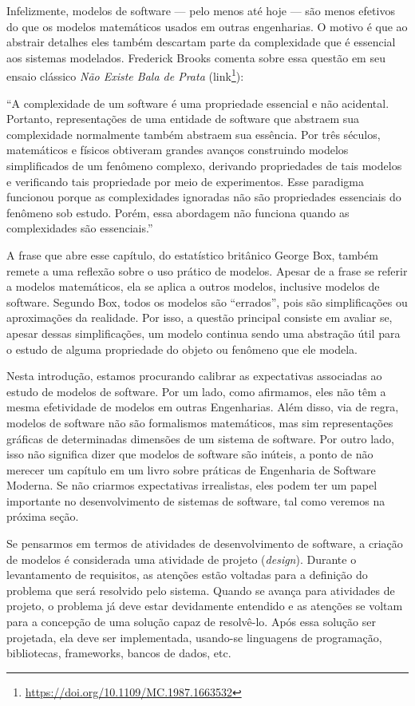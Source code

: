 \documentclass[
  11pt,
  twoside]{book}
\DeclareRobustCommand{\href}[2]{#2\footnote{\url{#1}}}
\renewenvironment{quote}{\centering \vspace{1.5ex} \begin{tcolorbox}[colback=backcolor, width=4.9in]}{\end{tcolorbox}}
\begin{document}
Infelizmente, modelos de software --- pelo menos até hoje --- são menos
efetivos do que os modelos matemáticos usados em outras engenharias. O
motivo é que ao abstrair detalhes eles também descartam parte da
complexidade que é essencial aos sistemas modelados. Frederick Brooks
comenta sobre essa questão em seu ensaio clássico \emph{Não Existe Bala
de Prata} (\href{https://doi.org/10.1109/MC.1987.1663532}{link}):

\begin{quote}
``A complexidade de um software é uma propriedade essencial e não
acidental. Portanto, representações de uma entidade de software que
abstraem sua complexidade normalmente também abstraem sua essência. Por
três séculos, matemáticos e físicos obtiveram grandes avanços
construindo modelos simplificados de um fenômeno complexo, derivando
propriedades de tais modelos e verificando tais propriedade por meio de
experimentos. Esse paradigma funcionou porque as complexidades ignoradas
não são propriedades essenciais do fenômeno sob estudo. Porém, essa
abordagem não funciona quando as complexidades são essenciais.''
\end{quote}

 A frase que abre esse capítulo, do estatístico
britânico George Box, também remete a uma reflexão sobre o uso prático
de modelos. Apesar de a frase se referir a modelos matemáticos, ela se
aplica a outros modelos, inclusive modelos de software. Segundo Box,
todos os modelos são ``errados'', pois são simplificações ou
aproximações da realidade. Por isso, a questão principal consiste em
avaliar se, apesar dessas simplificações, um modelo continua sendo uma
abstração útil para o estudo de alguma propriedade do objeto ou fenômeno
que ele modela.

Nesta introdução, estamos procurando calibrar as expectativas associadas
ao estudo de modelos de software. Por um lado, como afirmamos, eles não
têm a mesma efetividade de modelos em outras Engenharias. Além disso,
via de regra, modelos de software não são formalismos matemáticos, mas
sim representações gráficas de determinadas dimensões de um sistema de
software. Por outro lado, isso não significa dizer que modelos de
software são inúteis, a ponto de não merecer um capítulo em um livro
sobre práticas de Engenharia de Software Moderna. Se não criarmos
expectativas irrealistas, eles podem ter um papel importante no
desenvolvimento de sistemas de software, tal como veremos na próxima
seção.

Se pensarmos em termos de atividades de desenvolvimento de software, a
criação de modelos é considerada uma atividade de projeto
(\emph{design}). Durante o levantamento de requisitos, as atenções estão
voltadas para a definição do problema que será resolvido pelo sistema.
Quando se avança para atividades de projeto, o problema já deve estar
devidamente entendido e as atenções se voltam para a concepção de uma
solução capaz de resolvê-lo. Após essa solução ser projetada, ela deve
ser implementada, usando-se linguagens de programação, bibliotecas,
frameworks, bancos de dados, etc.
\end{document}
